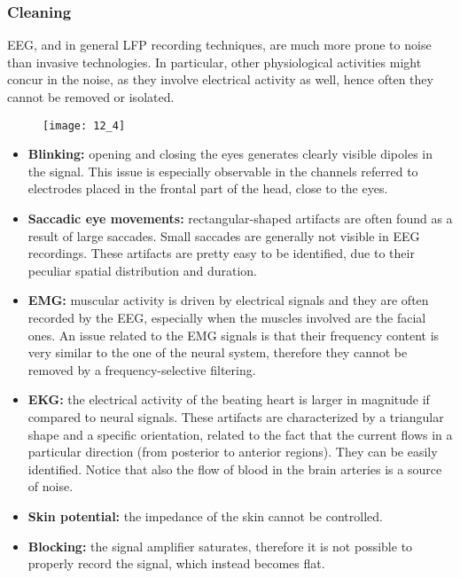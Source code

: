 \subsubsection{Cleaning}
EEG, and in general LFP recording techniques, are much more prone to noise than
invasive technologies. In particular, other physiological activities might concur
in the noise, as they involve electrical activity as well, hence often they cannot be removed or isolated.
\begin{figure}[H]
    \centering
    \texttt{[image: 12\_4]}
\end{figure}
\begin{itemize}
    \item \textbf{Blinking:} opening and closing the eyes generates clearly visible dipoles
          in the signal. This issue is especially observable in the channels referred to
          electrodes placed in the frontal part of the head, close to the eyes.
    \item \textbf{Saccadic eye movements:} rectangular-shaped artifacts are often found as a
          result of large saccades. Small saccades are generally not visible in EEG
          recordings. These artifacts are pretty easy to be identified, due to their
          peculiar spatial distribution and duration.
    \item \textbf{EMG:} muscular activity is driven by electrical signals and they are often
          recorded by the EEG, especially when the muscles involved are the facial ones.
          An issue related to the EMG signals is that their frequency content is very similar
          to the one of the neural system, therefore they cannot be removed by a
          frequency-selective filtering.
    \item \textbf{EKG:} the electrical activity of the beating heart is larger in magnitude
          if compared to neural signals. These artifacts are characterized by a
          triangular shape and a specific orientation, related to the fact that the current flows
          in a particular direction (from posterior to anterior regions). They can be easily identified.
          Notice that also the flow of blood in the brain arteries is a source of noise.
    \item \textbf{Skin potential:} the impedance of the skin cannot be controlled.
    \item \textbf{Blocking:} the signal amplifier saturates, therefore it is not possible
          to properly record the signal, which instead becomes flat.
\end{itemize}
